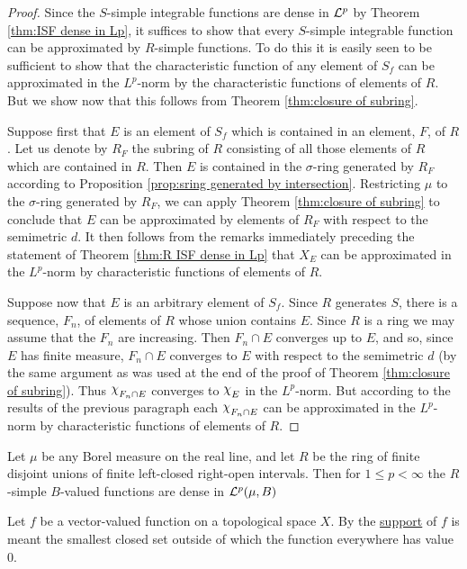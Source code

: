 \begin{proof}
Since the $S$-simple integrable functions are dense in ${\cal L}^p$ by Theorem \ref{thm:ISF dense in Lp}, it suffices to show that every $S$-simple integrable function can be approximated by $R$-simple functions. To do this it is easily seen to be sufficient to show that the characteristic function of any element of $S_f$ can be approximated in the $L^p$-norm by the characteristic functions of elements of $R$. But we show now that this follows from Theorem \ref{thm:closure of subring}.

Suppose first that $E$ is an element of $S_f$ which is contained in an element, $F$, of $R$. Let us denote by $R_F$ the subring of $R$ consisting of all those elements of $R$ which are contained in $R$. %
Then $E$ is contained in the $\sigma$-ring generated by $R_F$ according to Proposition \ref{prop:sring generated by intersection}. Restricting $\mu$ to the $\sigma$-ring generated by $R_F$, we can apply Theorem \ref{thm:closure of subring} to conclude that $E$ can be approximated by elements of $R_F$ with respect to the semimetric $d$. It then follows from the remarks immediately preceding the statement of Theorem \ref{thm:R ISF dense in Lp} that $X_E$ can be approximated in the $L^p$-norm by characteristic functions of elements of $R$.

Suppose now that $E$ is an arbitrary element of $S_f$. Since $R$ generates $S$, there is a sequence, $F_n$, of elements of $R$ whose union contains $E$. Since $R$ is a ring we may assume that the $F_n$ are increasing. Then $F_n\cap E$ converges up to $E$, and so, since $E$ has finite measure, $F_n\cap E$ converges to $E$ with respect to the semimetric $d$ (by the same argument as was used at the end of the proof of Theorem \ref{thm:closure of subring}). Thus $\idf{F_n\cap E}$ converges to $\idf{E}$ in the $L^p$-norm. But according to the results of the previous paragraph each $\idf{F_n\cap E}$ can be approximated in the $L^p$-norm by characteristic functions of elements of $R$.
\end{proof}

\begin{corollary}
\label{cor:lclosed ropen ISF dense in Lp}
Let $\mu$ be any Borel measure on the real line, and let $R$ be the ring of finite disjoint unions of finite left-closed right-open intervals. Then for $1\leq p<\infty$ the $R$-simple $B$-valued functions are dense in ${\cal L}^p(\mu, B)$
\end{corollary}

\begin{definition}
Let $f$ be a vector-valued function on a topological space $X$. By the \underline{support} of $f$ is meant the smallest closed set outside of which the function everywhere has value $0$.
\end{definition}

